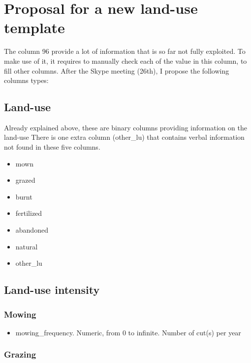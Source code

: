 \documentclass[table]{article}
\providecommand{\tightlist}{%
  \setlength{\itemsep}{0pt}\setlength{\parskip}{0pt}}
\begin{document}
\section{Proposal for a new land-use
template}\label{proposal-for-a-new-land-use-template}

The column 96 provide a lot of information that is so far not fully
exploited. To make use of it, it requires to manually check each of the
value in this column, to fill other columns. After the Skype meeting
(26th), I propose the following columns types:

\subsection{Land-use}\label{land-use}

Already explained above, these are binary columns providing information
on the land-use There is one extra column (other\_lu) that contains
verbal information not found in these five columns.

\begin{itemize}
\tightlist
\item
  mown
\item
  grazed
\item
  burnt
\item
  fertilized
\item
  abandoned
\item
  natural
\item
  other\_lu
\end{itemize}

\subsection{Land-use intensity}\label{land-use-intensity}

\subsubsection{Mowing}\label{mowing-1}

\begin{itemize}
\tightlist
\item
  mowing\_frequency. Numeric, from 0 to infinite. Number of cut(s) per
  year
\end{itemize}

\subsubsection{Grazing}\label{grazing-1}
\end{document}
